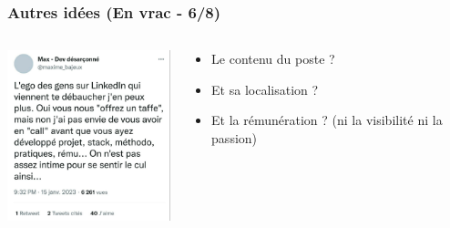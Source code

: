 \documentclass[slidetop,11pt]{beamer}
\begin{document}
\begin{frame}
	\frametitle{Autres id{\'e}es (En vrac - 6/8)}
	\begin{columns}[T]
	\begin{column}[T]{5cm}
		\includegraphics[width=5cm]{img/1673900833331.jpeg}~\\
	\end{column}
	\begin{column}[T]{7cm}
		\begin{itemize}
			\item Le contenu du poste ?
			\item Et sa localisation ?
			\item Et la r{\'e}mun{\'e}ration ? (ni la visibilit{\'e} ni la passion)
		\end{itemize}%
	\end{column}
	\end{columns}
\end{frame}
\end{document}

